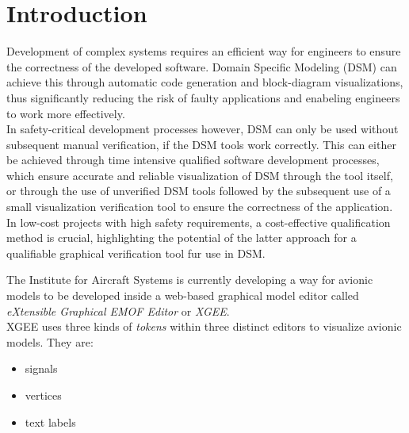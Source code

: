 \chapter{Introduction}
\label{chp:introduction}

Development of complex systems requires an efficient way for engineers to ensure the correctness of the developed software. Domain Specific Modeling (DSM) can achieve this through automatic code generation and block-diagram visualizations, thus significantly reducing the risk of faulty applications and enabeling engineers to work more effectively.\\
In safety-critical development processes however, DSM can only be used without subsequent manual verification, if the DSM tools work correctly. This can either be achieved through time intensive qualified software development processes, which ensure accurate and reliable visualization of DSM through the tool itself, or through the use of unverified DSM tools followed by the subsequent use of a small visualization verification tool to ensure the correctness of the application.\\
In low-cost projects with high safety requirements, a cost-effective qualification method is crucial, highlighting the potential of the latter approach for a qualifiable graphical verification tool fur use in DSM.

The Institute for Aircraft Systems is currently developing a way for avionic models to be developed inside a web-based graphical model editor called \textit{eXtensible Graphical EMOF Editor} or \textit{XGEE}.\\
XGEE uses three kinds of \textit{tokens} within three distinct editors to visualize avionic models. They are:
\begin{itemize}
    \item signals
    \item vertices
    \item text labels
\end{itemize}

